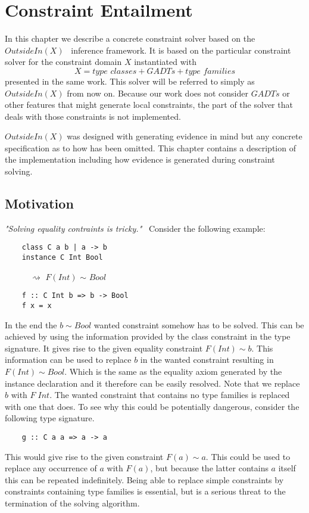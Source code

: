 \chapter{Constraint Entailment}
\label{cha:entailment}
In this chapter we describe a concrete constraint solver based on the
$OutsideIn(X)$~\cite{outsideinx-modular-type-inference-with-local-assumptions}
inference framework. It is based on the particular constraint solver for the
constraint domain $X$ instantiated with
\[
X = \textit{type classes} + \textit{GADTs} + \textit{type families}
\]
presented in the same work. This solver will be referred to simply as
$OutsideIn(X)$ from now on. Because our work does not consider $GADTs$ or other
features that might generate local constraints, the part of the solver that
deals with those constraints is not implemented.

$OutsideIn(X)$ was designed with generating evidence in mind but any concrete
specification as to how has been omitted. This chapter contains a description of
the implementation including how evidence is generated during constraint
solving.

\section{Motivation}
\label{sec:motivation}
\textit{"Solving equality contraints is
tricky."}~\cite{outsideinx-modular-type-inference-with-local-assumptions}
Consider the following example:
\begin{verbatim}
    class C a b | a -> b
    instance C Int Bool
\end{verbatim}
$\quad\quad\quad\rightsquigarrow$ $F(Int)$ $\sim$ $Bool$
\begin{verbatim}
    f :: C Int b => b -> Bool
    f x = x
\end{verbatim}

In the end the $b \sim Bool$ wanted constraint somehow has to be solved. This
can be achieved by using the information provided by the class constraint in the
type signature. It gives rise to the given equality constraint $F(Int) \sim
b$. This information can be used to replace $b$ in the wanted constraint
resulting in $F(Int) \sim Bool$. Which is the same as the equality axiom
generated by the instance declaration and it therefore can be easily resolved.
Note that we replace $b$ with $F \; Int$. The wanted constraint that contains no
type families is replaced with one that does. To see why this
could be potentially dangerous, consider the following type signature.
\begin{verbatim}
    g :: C a a => a -> a
\end{verbatim}
This would give rise to the given constraint $F(a) \sim a$. This could be used
to replace any occurrence of $a$ with $F(a)$, but because the latter contains
$a$ itself this can be repeated indefinitely. Being able to replace simple
constraints by constraints containing type families is essential, but is a serious threat to the
termination of the solving algorithm.

